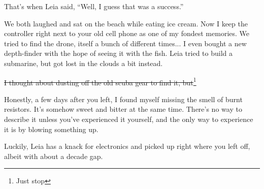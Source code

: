That's when Leia said, ``Well, I guess that was a success.''

We both laughed and sat on the beach while eating ice cream. Now I keep the controller right next to your old cell phone as one of my fondest memories.
We tried to find the drone, itself a bunch of different times... I even bought a new depth-finder with the hope of seeing it with the fish.
Leia tried to build a submarine, but got lost in the clouds a bit instead.

\sout{I thought about dusting off the old scuba gear to find it, but}\footnote{Just stop}

Honestly, a few days after you left, I found myself missing the smell of burnt resistors.
It's somehow sweet and bitter at the same time.
There's no way to describe it unless you've experienced it yourself, and the only way to experience it is by blowing something up.

Luckily, Leia has a knack for electronics and picked up right where you left off, albeit with about a decade gap.
